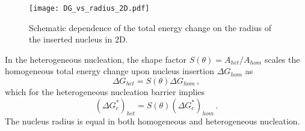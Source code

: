 \begin{figure}
	\centering
	\texttt{[image: DG\_vs\_radius\_2D.pdf]}
	\caption[Dependence of the total energy change on the radius of the inserted nucleus in 2D]{Schematic dependence of the total energy change on the radius of the inserted nucleus in 2D.}
	\label{fig_DG_2D_sketch}
\end{figure}

In the heterogeneous nucleation, the shape factor $S(\theta)=A_{het}/A_{hom}$ scales the homogeneous total energy change upon nucleus insertion $\Delta G_{hom}$ as
\begin{equation}\label{eq_DG_het_2D}
	\Delta G_{het} = S(\theta)\Delta G_{hom} \,,
\end{equation}
which for the heterogeneous nucleation barrier implies
\begin{equation}\label{eq_nucl_barr_het_2D}
	(\Delta G_c^*)_{het} = S(\theta)(\Delta G_c^*)_{hom}\,.
\end{equation}
The nucleus radius is equal in both homogeneous and heterogeneous nucleation.



